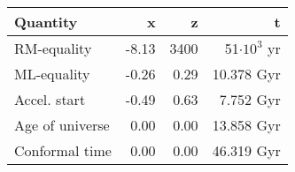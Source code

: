 \begin{tabular}{l|rrr}
\hline
Quantity & x & z & t  \\
\hline
RM-equality  & -8.13 & 3400 & 51$\cdot 10^3$ yr   \\
ML-equality  & -0.26 & 0.29 & 10.378  Gyr   \\
Accel. start  & -0.49 & 0.63 & 7.752 Gyr    \\
Age of universe  & 0.00 & 0.00 & 13.858 Gyr   \\
Conformal time  & 0.00 & 0.00 & 46.319 Gyr   \\
\hline
\hline
\end{tabular}
